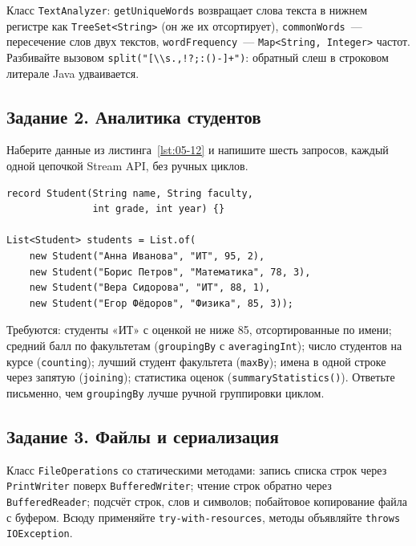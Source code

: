 Класс \texttt{TextAnalyzer}: \texttt{getUniqueWords} возвращает слова текста в
нижнем регистре как \texttt{TreeSet<String>} (он же их отсортирует),
\texttt{commonWords}~--- пересечение слов двух текстов,
\texttt{wordFrequency}~--- \texttt{Map<String, Integer>} частот. Разбивайте
вызовом \texttt{split("[\textbackslash\textbackslash s.,!?;:()-]+")}: обратный
слеш в строковом литерале Java удваивается.

\subsection*{Задание 2. Аналитика студентов}

Наберите данные из листинга~\ref{lst:05-12} и напишите шесть запросов, каждый
одной цепочкой Stream API, без ручных циклов.

\begin{listing}[H]
\begin{verbatim}
record Student(String name, String faculty,
               int grade, int year) {}

List<Student> students = List.of(
    new Student("Анна Иванова", "ИТ", 95, 2),
    new Student("Борис Петров", "Математика", 78, 3),
    new Student("Вера Сидорова", "ИТ", 88, 1),
    new Student("Егор Фёдоров", "Физика", 85, 3));
\end{verbatim}
\caption{Исходные данные для задания 2}
\label{lst:05-12}
\end{listing}

Требуются: студенты «ИТ» с оценкой не ниже 85, отсортированные по имени; средний
балл по факультетам (\texttt{groupingBy} с \texttt{averagingInt}); число
студентов на курсе (\texttt{counting}); лучший студент факультета
(\texttt{maxBy}); имена в одной строке через запятую (\texttt{joining});
статистика оценок (\texttt{summaryStatistics()}). Ответьте письменно, чем
\texttt{groupingBy} лучше ручной группировки циклом.

\subsection*{Задание 3. Файлы и сериализация}

Класс \texttt{FileOperations} со статическими методами: запись списка строк
через \texttt{PrintWriter} поверх \texttt{BufferedWriter}; чтение строк обратно
через \texttt{BufferedReader}; подсчёт строк, слов и символов; побайтовое
копирование файла с буфером. Всюду применяйте \texttt{try-with-resources},
методы объявляйте \texttt{throws IOException}.

